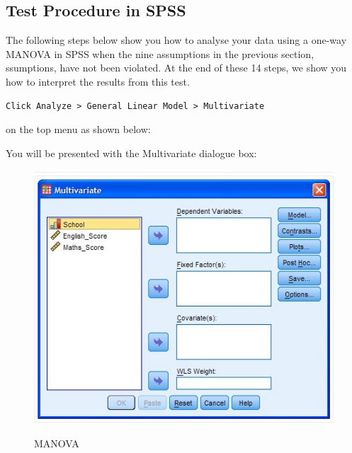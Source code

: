 \documentclass[a4paper,12pt]{article}
\begin{document}


\subsection{Test Procedure in SPSS}
The following steps below show you how to analyse your data using a one-way MANOVA in SPSS when the nine assumptions in the previous section, ssumptions, have not been violated. At the end of these 14 steps, we show you how to interpret the results from this test.
\begin{verbatim}
Click Analyze > General Linear Model > Multivariate
\end{verbatim}
on the top menu as shown below:



You will be presented with the Multivariate dialogue box:

\begin{center}
	\begin{figure}[h!]
		\includegraphics[scale=0.4]{MANOVA1}\\
		\caption{MANOVA}
	\end{figure}
\end{center}
\end{document}
